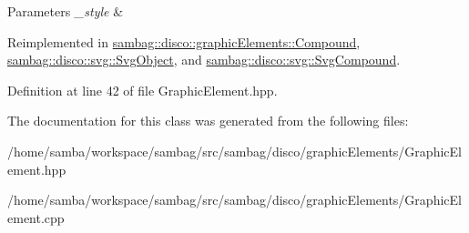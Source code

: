 \begin{DoxyParams}{Parameters}
{\em \_\-style} & \\
\hline
\end{DoxyParams}


Reimplemented in \hyperlink{classsambag_1_1disco_1_1graphic_elements_1_1_compound_a7a36ede1ba0ed02f7928d03a8dbaa36e}{sambag::disco::graphicElements::Compound}, \hyperlink{classsambag_1_1disco_1_1svg_1_1_svg_object_adbe97b7b7d0bb9e41add7304f090ac91}{sambag::disco::svg::SvgObject}, and \hyperlink{classsambag_1_1disco_1_1svg_1_1_svg_compound_afd816234932cc473e71799defc511b93}{sambag::disco::svg::SvgCompound}.



Definition at line 42 of file GraphicElement.hpp.



The documentation for this class was generated from the following files:\begin{DoxyCompactItemize}
\item 
/home/samba/workspace/sambag/src/sambag/disco/graphicElements/GraphicElement.hpp\item 
/home/samba/workspace/sambag/src/sambag/disco/graphicElements/GraphicElement.cpp\end{DoxyCompactItemize}
